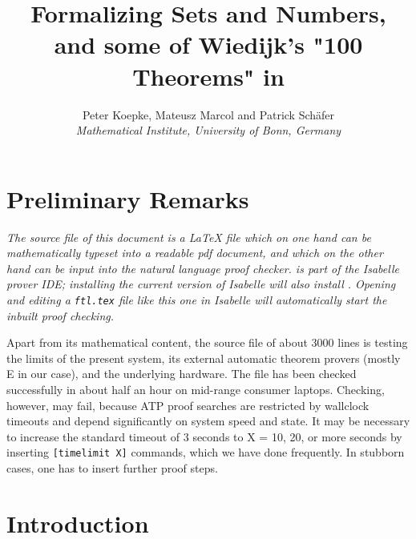 \documentclass{article}
\begin{document}
\newcommand{\Prod}[3]{#1_{#2} \cdots #1_{#3}}
\newcommand{\Seq}[2]{\{#1,\dots,#2\}}
\newcommand{\FinSet}[3]{\{#1_{#2},\dots,#1_{#3}\}}
\newcommand{\Primes}{\mathbb{P}}
\newcommand{\pow}{{\cal P}}
\newcommand{\range}{\operatorname{ran}}
\newcommand{\inv}[1]{#1^{-1}}
\newcommand{\sset}[2]{\{#1\}_{#2}}

\title{Formalizing Sets and Numbers, and some of Wiedijk's
"100 Theorems" in \Naproche{}}

\author{Peter Koepke, Mateusz Marcol and Patrick Schäfer\\
\emph{Mathematical Institute, University of Bonn, Germany}
}

\maketitle

\section*{Preliminary Remarks}

{\em The source file of this document is a \LaTeX{} file which on one hand can be mathematically
typeset into a readable pdf document, and which on the other hand can
be input into the \Naproche{} natural language proof checker. \Naproche{} is part of the
Isabelle prover IDE; installing the current version of Isabelle will also
install \Naproche{}. Opening and editing a \verb+ftl.tex+ file like this one
in Isabelle will automatically start the inbuilt \Naproche{} proof checking.

Apart from its mathematical content, the source file of about 3000
lines is testing the limits of the present \Naproche{}
system, its external automatic theorem provers (mostly E in our case),
and the underlying hardware. The file has been checked successfully
in about half an hour on mid-range consumer
laptops. Checking, however, may fail, because ATP proof searches
are restricted by wallclock timeouts and depend significantly on system speed and state.
It may be necessary to increase the standard timeout of 3 seconds to X = 10, 20, or
more seconds by inserting \verb+[timelimit X]+ commands, which we have done
frequently. In stubborn cases, one has to insert further proof steps.}

\tableofcontents

\newpage

\section{Introduction}
\end{document}
